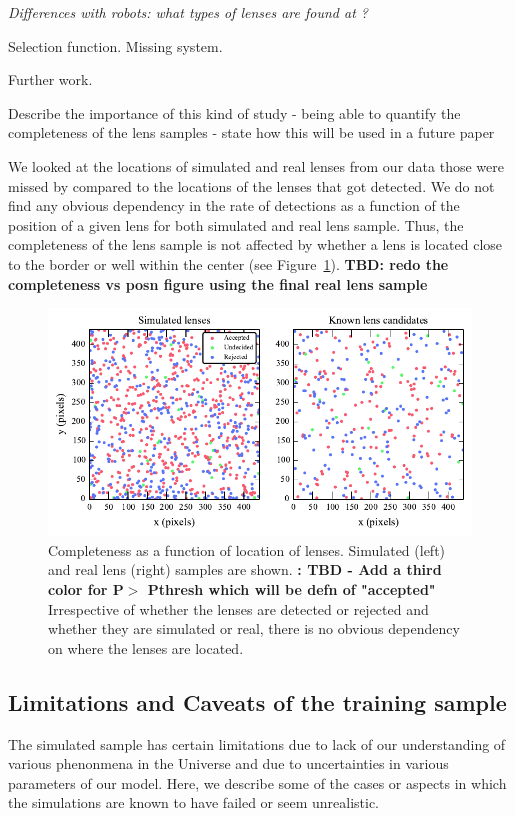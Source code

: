 \documentclass[useAMS,usenatbib,a4paper]{mn2e}
\begin{document}
{\it Differences with robots: what types of lenses are found at \sw?

Selection function. Missing system.

Further work.

Describe the importance of this kind of study 
- being able to quantify the completeness of the lens samples
- state how this will be used in a future \sw paper }

We looked at the locations of simulated and real lenses from our data
those were missed by \sw compared to the locations of the lenses that
got detected. We do not find any obvious dependency in the rate of
detections as a function of the position of a given lens for both
simulated and real lens sample. Thus, the completeness of the lens
sample is not affected by whether a lens is located close to the border
or well within the center (see  Figure~\ref{fig:comppos}).  {\bf TBD: redo the completeness vs posn
figure using the final real lens sample}

\begin{figure}
\begin{center}
\includegraphics[scale=0.95]{sw-cfhtls-figs/completeness_pos.pdf}
\caption{ \label{fig:comppos}
Completeness as a function of location of lenses. Simulated (left) and
real lens (right) samples are shown. {\bf: TBD - Add a third color for
P$>$ Pthresh which will be defn of "accepted"} Irrespective of whether the
lenses are detected or rejected and whether they are simulated or real,
there is no obvious dependency on where the lenses are located. 
}
\end{center}
\end{figure}

\subsection{Limitations and Caveats of the training sample}
The simulated sample has certain limitations due to lack of our understanding of
various phenonmena in the Universe and due to uncertainties in various
parameters of our model. Here, we describe some of the cases or aspects in which the
simulations are known to have failed or seem unrealistic. 
\end{document}
